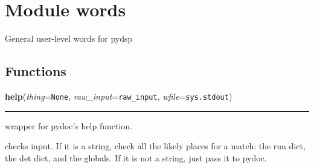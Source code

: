 %
%
%


\section{Module words}

    \label{words}
General user-level words for pydsp



  \subsection{Functions}

    \label{words:help}

    \vspace{0.5ex}

    \begin{boxedminipage}{\textwidth}

    \raggedright \textbf{help}(\textit{thing}=\texttt{None}, \textit{raw\_input}=\texttt{raw\_input}, \textit{wfile}=\texttt{sys.stdout})

    \vspace{-1.5ex}

    \rule{\textwidth}{0.5\fboxrule}
    wrapper for pydoc's help function.

    checks input. If it is a string, check all the likely places for a 
    match: the run dict, the det dict, and the globals. If it is not a 
    string, just pass it to pydoc.

    \vspace{1ex}

    \end{boxedminipage}

    \label{words:see}

    \vspace{0.5ex}

